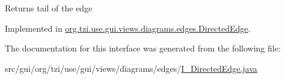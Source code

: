 \begin{DoxyReturn}{Returns}
tail of the edge 
\end{DoxyReturn}


Implemented in \hyperlink{classorg_1_1tzi_1_1use_1_1gui_1_1views_1_1diagrams_1_1edges_1_1_directed_edge_a9184776f5f05ae65be98665fac219b27}{org.\-tzi.\-use.\-gui.\-views.\-diagrams.\-edges.\-Directed\-Edge}.



The documentation for this interface was generated from the following file\-:\begin{DoxyCompactItemize}
\item 
src/gui/org/tzi/use/gui/views/diagrams/edges/\hyperlink{_i___directed_edge_8java}{I\-\_\-\-Directed\-Edge.\-java}\end{DoxyCompactItemize}
